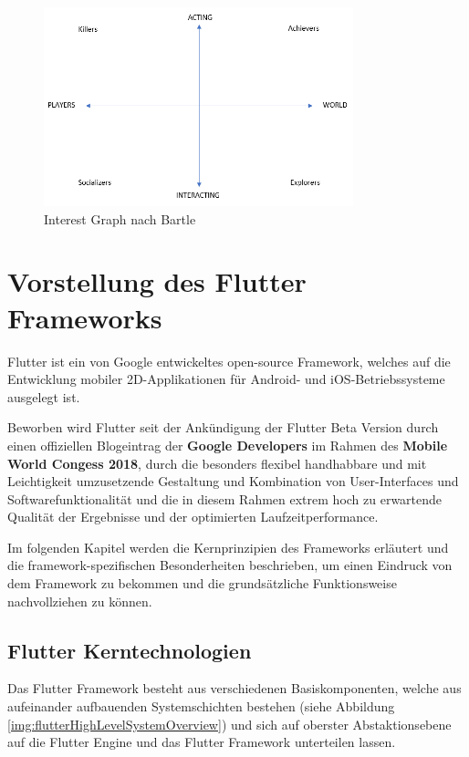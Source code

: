 \documentclass[bibliography=totoc,listof=totoc,BCOR=5mm,DIV=12,oneside]{scrbook}
\begin{document}
\begin{figure}[H]
	\centering
	\includegraphics[width=0.8\textwidth, keepaspectratio]{Bilder/Diagramme/InterestGraphBartle.png}
	\caption{Interest Graph nach Bartle \cite{bartle1996hearts}}
	\label{img:interetGraphBartle}
\end{figure}

\newpage
\section{Vorstellung des Flutter Frameworks}
\par Flutter ist ein von Google entwickeltes open-source Framework, welches auf die Entwicklung mobiler 2D-Applikationen für Android- und iOS-Betriebssysteme ausgelegt ist. 
\par \medskip Beworben wird Flutter seit der Ankündigung der Flutter Beta Version durch einen offiziellen Blogeintrag der \textbf{Google Developers}\citep{AnouncingFlutterBeta} im Rahmen des \textbf{Mobile World Congess 2018}\citep{MobileWordCongress}, durch die besonders flexibel handhabbare und mit Leichtigkeit umzusetzende Gestaltung und Kombination von User-Interfaces und Softwarefunktionalität und die in diesem Rahmen extrem hoch zu erwartende Qualität der Ergebnisse und der optimierten Laufzeitperformance. 

\par \medskip Im folgenden Kapitel werden die Kernprinzipien des Frameworks erläutert und die framework-spezifischen Besonderheiten beschrieben, um einen Eindruck von dem Framework zu bekommen und die grundsätzliche Funktionsweise nachvollziehen zu können.

\subsection{Flutter Kerntechnologien} 
Das Flutter Framework besteht aus verschiedenen Basiskomponenten, welche aus aufeinander aufbauenden Systemschichten bestehen (siehe Abbildung \ref{img:flutterHighLevelSystemOverview}) und sich auf oberster Abstaktionsebene auf die Flutter Engine und das Flutter Framework unterteilen lassen.
\end{document}
